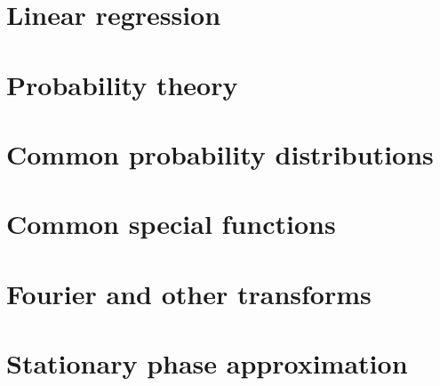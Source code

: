 \documentclass[12pt]{report}
\theoremstyle{definition}
\begin{document}
\chapter{Linear regression}
\label{chap:linear-regression}

\appendix

\chapter{Probability theory}
\label{chap:probability-theory}


\chapter{Common probability distributions}
\label{chap:probability-distributions}


\chapter{Common special functions}
\label{chap:special-functions}


\chapter{Fourier and other transforms}
\label{chap:fourier-transforms}


\chapter{Stationary phase approximation}
\label{chap:stationary-phase}


\cleardoublepage 
  
\end{document}
